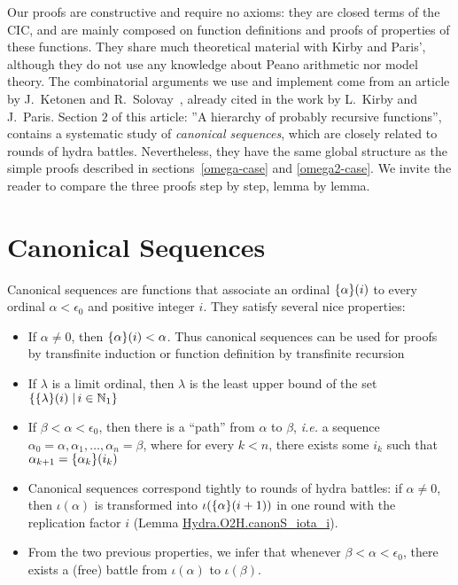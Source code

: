 Our proofs are  constructive and require no axioms: they are  closed terms of the CIC, and are mainly composed on function definitions and proofs of properties of these functions. 
They  share much theoretical material with Kirby and Paris', although they do not use any knowledge about Peano arithmetic nor model  theory.  The combinatorial arguments we use and implement
come from 
 an article by J.~Ketonen and R.~Solovay~\cite{KS81}, already  cited in the work
 by L.~Kirby and J.~Paris. %
 Section $2$ of this article: ''A hierarchy of probably recursive functions'', contains a systematic study of \emph{canonical sequences}, which are closely related to
rounds of hydra battles. 
Nevertheless, they have the same global structure as the simple proofs described in
sections~\vref{omega-case} and \vref{omega2-case}. 
We invite the reader to compare the three proofs step by step, lemma by lemma.

\section{Canonical Sequences}
\label{ketonen-solovay-sect}

Canonical sequences are functions that associate an ordinal $\mbox{$\{\alpha\}(i)$}$ to every ordinal $\alpha<\epsilon_0$ and positive integer $i$. They satisfy several nice properties:

\begin{itemize}
\item If $\alpha\not=0$, then $\mbox{$\{\alpha\}(i)$}<\alpha$. Thus canonical sequences can be used for proofs by transfinite induction or function definition by transfinite recursion
\item If $\lambda$ is a limit ordinal, then $\lambda$ is the least upper bound of the set 
$\{\mbox{$\{\lambda\}(i)$}\;|\,i\in\mathbb{N}_1\}$


\item If $\beta<\alpha<\epsilon_0$, then there is a ``path'' from $\alpha$ to $\beta$, \emph{i.e.} a
sequence $\alpha_0=\alpha, \alpha_1, \dots, \alpha_n=\beta$, where for every $k<n$, there exists some $i_k$ such that $\alpha_{k+1}=\mbox{$\{\alpha_k\}(i_k)$}$
\item Canonical sequences correspond tightly to rounds of hydra battles: if $\alpha\not=0$,
then $\iota(\alpha)$ is transformed into $\iota(\mbox{$\{\alpha\}(i+1)$})$ in one round with
the replication factor $i$ (Lemma \href{../theories/html/hydras.Hydra.O2H.html\#canonS_iota_i}{Hydra.O2H.canonS\_iota\_i}).
\item From the two previous properties, we infer that whenever $\beta<\alpha<\epsilon_0$, there exists a (free) battle from $\iota(\alpha)$ to $\iota(\beta)$.
\end{itemize}

